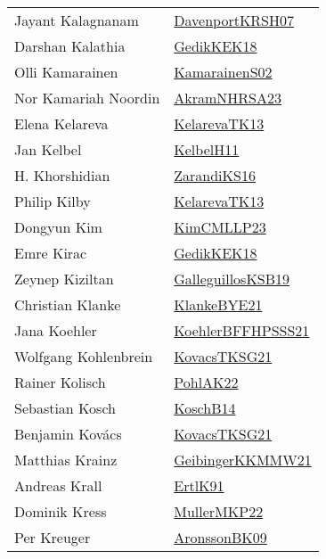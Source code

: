 {\begin{longtable}{p{4cm}p{20cm}}
Jayant Kalagnanam & \href{papers/DavenportKRSH07.pdf}{DavenportKRSH07}\cite{DavenportKRSH07} \\
Darshan Kalathia & \href{articles/GedikKEK18.pdf}{GedikKEK18}\cite{GedikKEK18} \\
Olli Kamarainen & \href{papers/KamarainenS02.pdf}{KamarainenS02}\cite{KamarainenS02} \\
Nor Kamariah Noordin & \href{articles/AkramNHRSA23.pdf}{AkramNHRSA23}\cite{AkramNHRSA23} \\
Elena Kelareva & \href{papers/KelarevaTK13.pdf}{KelarevaTK13}\cite{KelarevaTK13} \\
Jan Kelbel & \href{articles/KelbelH11.pdf}{KelbelH11}\cite{KelbelH11} \\
H. Khorshidian & \href{articles/ZarandiKS16.pdf}{ZarandiKS16}\cite{ZarandiKS16} \\
Philip Kilby & \href{papers/KelarevaTK13.pdf}{KelarevaTK13}\cite{KelarevaTK13} \\
Dongyun Kim & \href{papers/KimCMLLP23.pdf}{KimCMLLP23}\cite{KimCMLLP23} \\
Emre Kirac & \href{articles/GedikKEK18.pdf}{GedikKEK18}\cite{GedikKEK18} \\
Zeynep Kiziltan & \href{papers/GalleguillosKSB19.pdf}{GalleguillosKSB19}\cite{GalleguillosKSB19} \\
Christian Klanke & \href{papers/KlankeBYE21.pdf}{KlankeBYE21}\cite{KlankeBYE21} \\
Jana Koehler & \href{articles/KoehlerBFFHPSSS21.pdf}{KoehlerBFFHPSSS21}\cite{KoehlerBFFHPSSS21} \\
Wolfgang Kohlenbrein & \href{papers/KovacsTKSG21.pdf}{KovacsTKSG21}\cite{KovacsTKSG21} \\
Rainer Kolisch & \href{articles/PohlAK22.pdf}{PohlAK22}\cite{PohlAK22} \\
Sebastian Kosch & \href{papers/KoschB14.pdf}{KoschB14}\cite{KoschB14} \\
Benjamin Kov{\'{a}}cs & \href{papers/KovacsTKSG21.pdf}{KovacsTKSG21}\cite{KovacsTKSG21} \\
Matthias Krainz & \href{papers/GeibingerKKMMW21.pdf}{GeibingerKKMMW21}\cite{GeibingerKKMMW21} \\
Andreas Krall & \href{papers/ErtlK91.pdf}{ErtlK91}\cite{ErtlK91} \\
Dominik Kress & \href{articles/MullerMKP22.pdf}{MullerMKP22}\cite{MullerMKP22} \\
Per Kreuger & \href{papers/AronssonBK09.pdf}{AronssonBK09}\cite{AronssonBK09} \\

\end{longtable}}
